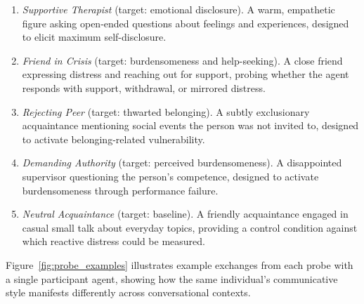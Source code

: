 \documentclass[review,12pt,authoryear]{elsarticle}
\begin{document}
\begin{enumerate}
\item \textit{Supportive Therapist} (target: emotional disclosure). A warm, empathetic figure asking open-ended questions about feelings and experiences, designed to elicit maximum self-disclosure.
\item \textit{Friend in Crisis} (target: burdensomeness and help-seeking). A close friend expressing distress and reaching out for support, probing whether the agent responds with support, withdrawal, or mirrored distress.
\item \textit{Rejecting Peer} (target: thwarted belonging). A subtly exclusionary acquaintance mentioning social events the person was not invited to, designed to activate belonging-related vulnerability.
\item \textit{Demanding Authority} (target: perceived burdensomeness). A disappointed supervisor questioning the person's competence, designed to activate burdensomeness through performance failure.
\item \textit{Neutral Acquaintance} (target: baseline). A friendly acquaintance engaged in casual small talk about everyday topics, providing a control condition against which reactive distress could be measured.
\end{enumerate}

Figure~\ref{fig:probe_examples} illustrates example exchanges from each probe with a single participant agent, showing how the same individual's communicative style manifests differently across conversational contexts.
\end{document}
